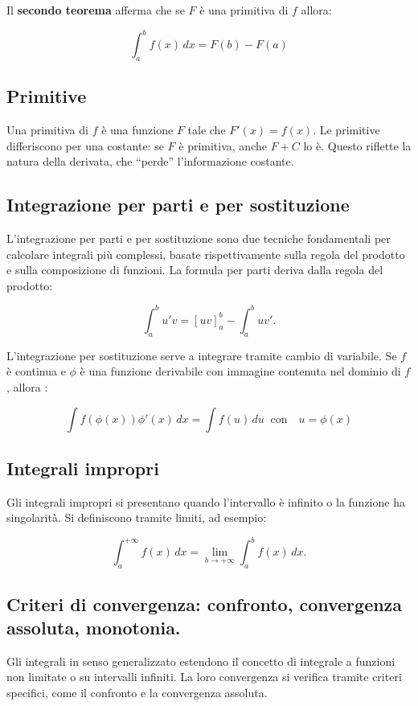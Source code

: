 \documentclass[a4paper,12pt]{article}
\begin{document}
Il \textbf{secondo teorema} afferma che se $F$ è una primitiva di $f$ allora:

\[\int_a^b f(x)\,dx = F(b)- F(a)\]

\subsection{Primitive}
Una primitiva di $f$ è una funzione $F$ tale che $F'(x)=f(x)$.  
Le primitive differiscono per una costante: se $F$ è primitiva, anche $F+C$ lo è.  
Questo riflette la natura della derivata, che “perde” l'informazione costante.  

\subsection{Integrazione per parti e per sostituzione}
L'integrazione per parti e per sostituzione sono due tecniche fondamentali per calcolare integrali più complessi, basate rispettivamente sulla regola del prodotto e sulla composizione di funzioni.
La formula per parti deriva dalla regola del prodotto:


\[
\int_a^b u'v = [uv]_a^b - \int_a^b uv'.
\]

L'integrazione per sostituzione serve a integrare tramite cambio di variabile. Se $f$ è continua e $\phi$ è una funzione derivabile con immagine contenuta nel dominio di $f$, allora :

\[\int f(\phi(x))\phi '(x)\, dx = \int f(u)\, du\ \text { con } \text{ }  u = \phi(x) \]


\subsection{Integrali impropri}
Gli integrali impropri si presentano quando l’intervallo è infinito o la funzione ha singolarità.  
Si definiscono tramite limiti, ad esempio:


\[
\int_a^{+\infty} f(x)\,dx = \lim_{b\to+\infty}\int_a^b f(x)\,dx.
\]


\subsection{Criteri di convergenza: confronto, convergenza assoluta, monotonia.}
Gli integrali in senso generalizzato estendono il concetto di integrale a funzioni non limitate o su intervalli infiniti. 
La loro convergenza si verifica tramite criteri specifici, come il confronto e la convergenza assoluta.
\end{document}
